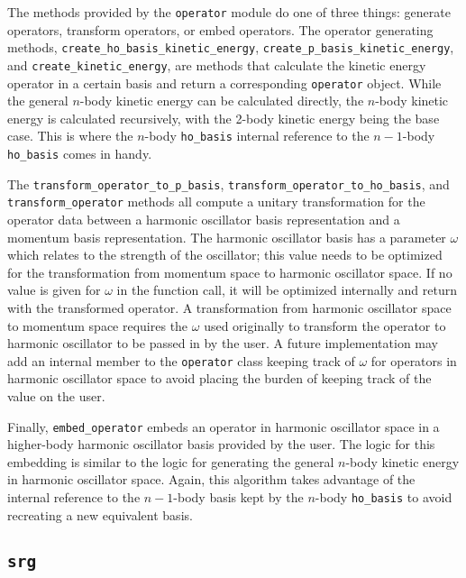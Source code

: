 The methods provided by the \texttt{operator} module do one of three things: generate operators, transform operators, or embed operators. The operator generating methods, \texttt{create\_ho\_basis\_kinetic\_energy}, \texttt{create\_p\_basis\_kinetic\_energy}, and \texttt{create\_kinetic\_energy}, are methods that calculate the kinetic energy operator in a certain basis and return a corresponding \texttt{operator} object. While the general $n$-body kinetic energy can be calculated directly, the $n$-body kinetic energy is calculated recursively, with the 2-body kinetic energy being the base case. This is where the $n$-body \texttt{ho\_basis} internal reference to the $n-1$-body \texttt{ho\_basis} comes in handy.

The \texttt{transform\_operator\_to\_p\_basis}, \texttt{transform\_operator\_to\_ho\_basis}, and \texttt{transform\_operator} methods all compute a unitary transformation for the operator data between a harmonic oscillator basis representation and a momentum basis representation. The harmonic oscillator basis has a parameter $\omega$ which relates to the strength of the oscillator; this value needs to be optimized for the transformation from momentum space to harmonic oscillator space. If no value is given for $\omega$ in the function call, it will be optimized internally and return with the transformed operator. A transformation from harmonic oscillator space to momentum space requires the $\omega$ used originally to transform the operator to harmonic oscillator to be passed in by the user. A future implementation may add an internal member to the \texttt{operator} class keeping track of $\omega$ for operators in harmonic oscillator space to avoid placing the burden of keeping track of the value on the user.

Finally, \texttt{embed\_operator} embeds an operator in harmonic oscillator space in a higher-body harmonic oscillator basis provided by the user. The logic for this embedding is similar to the logic for generating the general $n$-body kinetic energy in harmonic oscillator space. Again, this algorithm takes advantage of the internal reference to the $n-1$-body basis kept by the $n$-body \texttt{ho\_basis} to avoid recreating a new equivalent basis.

\subsection{\texttt{srg}}

